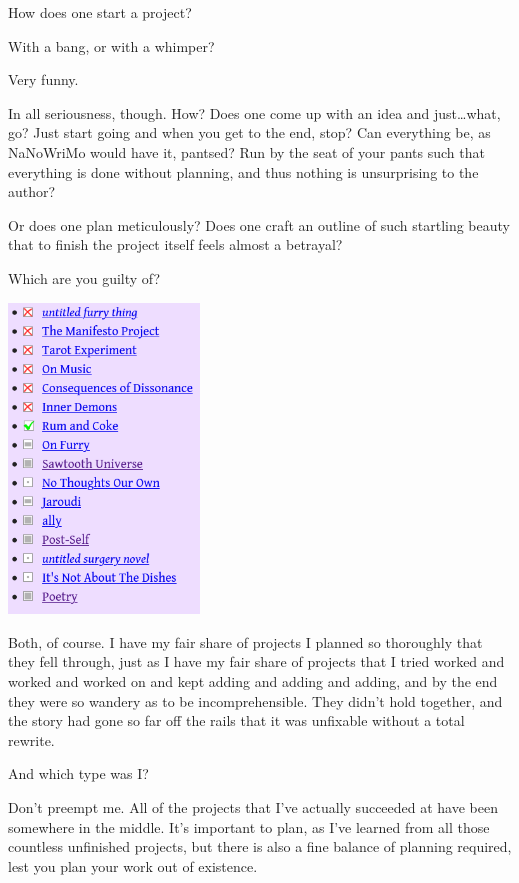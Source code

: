 \begin{paracol}{2}
\begin{leftcolumn}
\noindent How does one start a project?

\begin{ally}
  With a bang, or with a whimper?
\end{ally}
Very funny.

In all seriousness, though. How? Does one come up with an idea and just\ldots{}what, go? Just start going and when you get to the end, stop? Can everything be, as NaNoWriMo would have it, pantsed? Run by the seat of your pants such that everything is done without planning, and thus nothing is unsurprising to the author?

Or does one plan meticulously? Does one craft an outline of such startling beauty that to finish the project itself feels almost a betrayal?

\begin{ally}
  Which are you guilty of?
\end{ally}
\end{leftcolumn}
\begin{rightcolumn*}
\includegraphics[width=2in]{assets/project-list.png}
\end{rightcolumn*}
\begin{leftcolumn}
Both, of course. I have my fair share of projects I planned so thoroughly that they fell through, just as I have my fair share of projects that I tried worked and worked and worked on and kept adding and adding and adding, and by the end they were so wandery as to be incomprehensible. They didn't hold together, and the story had gone so far off the rails that it was unfixable without a total rewrite.

\begin{ally}
  And which type was I?
\end{ally}
Don't preempt me. All of the projects that I've actually succeeded at have been somewhere in the middle. It's important to plan, as I've learned from all those countless unfinished projects, but there is also a fine balance of planning required, lest you plan your work out of existence.


\end{leftcolumn}
\end{paracol}
